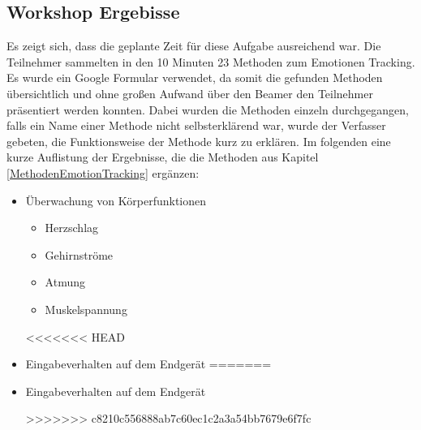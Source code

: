 \subsection{Workshop Ergebisse}

Es zeigt sich, dass die geplante Zeit für diese Aufgabe ausreichend war. Die Teilnehmer sammelten in den 10 Minuten 23 Methoden zum Emotionen Tracking. Es wurde ein Google Formular verwendet, da somit die gefunden Methoden übersichtlich und ohne großen Aufwand über den Beamer den Teilnehmer präsentiert werden konnten. Dabei wurden die Methoden einzeln durchgegangen, falls ein Name einer Methode nicht selbsterklärend war, wurde der Verfasser gebeten, die Funktionsweise der Methode kurz zu erklären. Im folgenden eine kurze Auflistung der Ergebnisse, die die Methoden aus Kapitel \ref{MethodenEmotionTracking} ergänzen:

\begin{itemize}
	\item Überwachung von Körperfunktionen
	\begin{itemize}
		\item Herzschlag
		\item Gehirnströme
		\item Atmung
		\item Muskelspannung
	\end{itemize}
<<<<<<< HEAD
	\item Eingabeverhalten auf dem Endgerät	
=======
	\item Eingabeverhalten auf dem Endgerät
	
>>>>>>> c8210c556888ab7c60ec1c2a3a54bb7679e6f7fc
\end{itemize}

